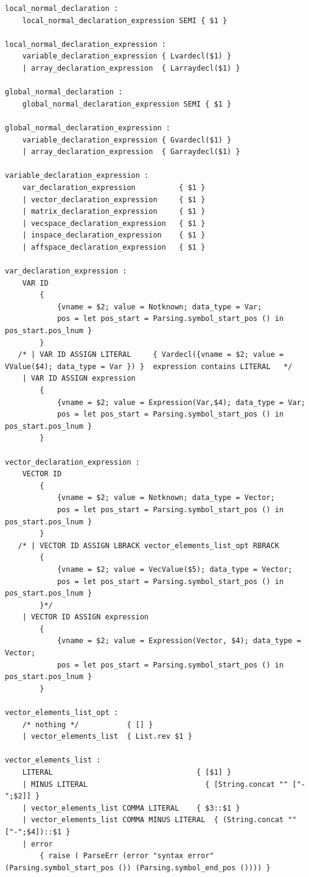 \documentclass[12pt]{article} %
\begin{document}
\begin{lstlisting}[style=appendix, caption=parser.mly]
local_normal_declaration :
    local_normal_declaration_expression SEMI { $1 }

local_normal_declaration_expression :
    variable_declaration_expression { Lvardecl($1) }
    | array_declaration_expression  { Larraydecl($1) }

global_normal_declaration :
    global_normal_declaration_expression SEMI { $1 }

global_normal_declaration_expression :
    variable_declaration_expression { Gvardecl($1) }
    | array_declaration_expression  { Garraydecl($1) }

variable_declaration_expression :
    var_declaration_expression          { $1 }
    | vector_declaration_expression     { $1 }  
    | matrix_declaration_expression     { $1 }
    | vecspace_declaration_expression   { $1 }
    | inspace_declaration_expression    { $1 }
    | affspace_declaration_expression   { $1 }

var_declaration_expression :
    VAR ID                      
        { 
            {vname = $2; value = Notknown; data_type = Var; 
            pos = let pos_start = Parsing.symbol_start_pos () in pos_start.pos_lnum } 
        }
   /* | VAR ID ASSIGN LITERAL     { Vardecl({vname = $2; value = VValue($4); data_type = Var }) }  expression contains LITERAL   */ 
    | VAR ID ASSIGN expression  
        { 
            {vname = $2; value = Expression(Var,$4); data_type = Var; 
            pos = let pos_start = Parsing.symbol_start_pos () in pos_start.pos_lnum } 
        }

vector_declaration_expression :
    VECTOR ID   
        { 
            {vname = $2; value = Notknown; data_type = Vector; 
            pos = let pos_start = Parsing.symbol_start_pos () in pos_start.pos_lnum } 
        }
   /* | VECTOR ID ASSIGN LBRACK vector_elements_list_opt RBRACK 
        { 
            {vname = $2; value = VecValue($5); data_type = Vector; 
            pos = let pos_start = Parsing.symbol_start_pos () in pos_start.pos_lnum } 
        }*/
    | VECTOR ID ASSIGN expression
        { 
            {vname = $2; value = Expression(Vector, $4); data_type = Vector; 
            pos = let pos_start = Parsing.symbol_start_pos () in pos_start.pos_lnum } 
        }

vector_elements_list_opt :
    /* nothing */           { [] }
    | vector_elements_list  { List.rev $1 }

vector_elements_list :
    LITERAL                                 { [$1] }
    | MINUS LITERAL                           { [String.concat "" ["-";$2]] }
    | vector_elements_list COMMA LITERAL    { $3::$1 }
    | vector_elements_list COMMA MINUS LITERAL  { (String.concat "" ["-";$4])::$1 }
    | error 
        { raise ( ParseErr (error "syntax error" (Parsing.symbol_start_pos ()) (Parsing.symbol_end_pos ()))) }


\end{lstlisting}
\end{document}
